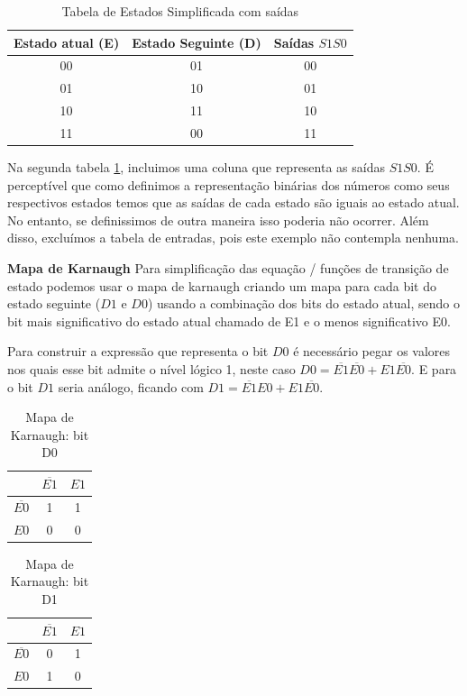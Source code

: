 \documentclass[12pt]{article}
\begin{document}
\begin{table}[H]
    \centering
    \begin{tabular}{|c|c|c|}
    \hline
    Estado atual (E) & Estado Seguinte (D)  & Saídas $S1 S0 $  \\
    \hline
    00 & 01 & 00 \\
    01 & 10 & 01 \\
    10 & 11 & 10 \\
    11 & 00 & 11 \\
    \hline
    \end{tabular}
    \caption{Tabela de Estados Simplificada com saídas}
    \label{tab:tabela_estados2}
\end{table}


Na segunda tabela \ref{tab:tabela_estados2}, incluimos uma coluna que representa as saídas $S1S0$. É perceptível que como definimos a representação binárias dos números como seus respectivos estados temos que as saídas de cada estado são iguais ao estado atual. No entanto, se definissimos de outra maneira isso poderia não ocorrer. Além disso, excluímos a tabela de entradas, pois este exemplo não contempla nenhuma.

\textbf{Mapa de Karnaugh}
Para simplificação das equação / funções de transição de estado podemos usar o mapa de karnaugh criando um mapa para cada bit do estado seguinte ($D1$ e $D0$) usando a combinação dos bits do estado atual, sendo o bit mais significativo do estado atual chamado de E1 e o menos significativo E0.

Para construir a expressão que representa o bit $D0$ é necessário pegar os valores nos quais esse bit admite o nível lógico 1, neste caso $D0 = \overline{E1}\overline{E0} + E1\overline{E0}$. E para o bit $D1$ seria análogo, ficando com $D1 = \overline{E1}E0 + E1\overline{E0}$.

\begin{table}[H]
\centering
\renewcommand{\arraystretch}{1.3} %
\begin{tabular}{|c|c|c|}
\hline
 & $\overline{E1}$ & $E1$ \\
\hline
$\overline{E0}$ & 1 & 1 \\
\hline
$E0$ & 0 & 0 \\
\hline
\end{tabular}
\caption{Mapa de Karnaugh: bit D0}
\label{tab:karnaugh-bitD0}
\end{table}

\begin{table}[H]
\centering
\renewcommand{\arraystretch}{1.3} %
\begin{tabular}{|c|c|c|}
\hline
 & $\overline{E1}$ & $E1$ \\
\hline
$\overline{E0}$ & 0 & 1 \\
\hline
$E0$ & 1 & 0 \\
\hline
\end{tabular}
\caption{Mapa de Karnaugh: bit D1}
\label{tab:karnaugh-bitD1}
\end{table}
\end{document}
